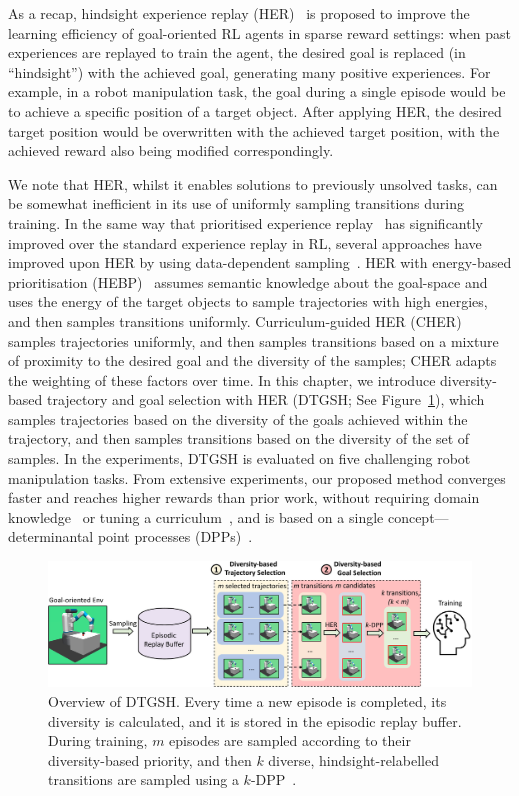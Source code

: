 As a recap, hindsight experience replay (HER)~\cite{andrychowicz2017hindsight} is proposed to improve the learning efficiency of goal-oriented RL agents in sparse reward settings: when past experiences are replayed to train the agent, the desired goal is replaced (in ``hindsight'') with the achieved goal, generating many positive experiences. For example, in a robot manipulation task, the goal during a single episode would be to achieve a specific position of a target object. After applying HER, the desired target position would be overwritten with the achieved target position, with the achieved reward also being modified correspondingly.

We note that HER, whilst it enables solutions to previously unsolved tasks, can be somewhat inefficient in its use of uniformly sampling transitions during training. In the same way that prioritised experience replay~\cite{schaul2016prioritized} has significantly improved over the standard experience replay in RL, several approaches have improved upon HER by using data-dependent sampling~\cite{fang2019curriculum,zhao2018energy}. HER with energy-based prioritisation (HEBP)~\cite{zhao2018energy} assumes semantic knowledge about the goal-space and uses the energy of the target objects to sample trajectories with high energies, and then samples transitions uniformly. Curriculum-guided HER (CHER)~\cite{fang2019curriculum} samples trajectories uniformly, and then samples transitions based on a mixture of proximity to the desired goal and the diversity of the samples; CHER adapts the weighting of these factors over time. In this chapter, we introduce diversity-based trajectory and goal selection with HER (DTGSH; See Figure~\ref{fig:illustration_c4}), which samples trajectories based on the diversity of the goals achieved within the trajectory, and then samples transitions based on the diversity of the set of samples. In the experiments, DTGSH is evaluated on five challenging robot manipulation tasks. From extensive experiments, our proposed method converges faster and reaches higher rewards than prior work, without requiring domain knowledge~\cite{zhao2018energy} or tuning a curriculum~\cite{fang2019curriculum}, and is based on a single concept---determinantal point processes (DPPs)~\cite{kulesza2012determinantal}.
\begin{figure}[h]
    \centering
    \includegraphics[width=\textwidth]{figures/chapter4/illustration_DTGSH_latest.pdf}
    \caption[Overview of DTGSH.]{Overview of DTGSH. Every time a new episode is completed, its diversity is calculated, and it is stored in the episodic replay buffer. During training, $m$ episodes are sampled according to their diversity-based priority, and then $k$ diverse, hindsight-relabelled transitions are sampled using a $k$-DPP~\cite{kulesza2011k}.}
    \label{fig:illustration_c4}
\end{figure}

